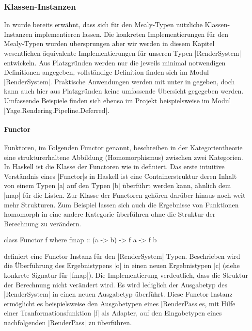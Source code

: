 
\subsubsection{Klassen-Instanzen}
\label{sec:rendersystem-klassen-instanzen}

In  wurde bereits erwähnt, dass sich für den Mealy-Typen nützliche Klassen-Instanzen implementieren lassen. Die konkreten Implementierungen für den Mealy-Typen wurden übersprungen aber wir werden in diesem Kapitel wesentlichen äquivalente Implementierungen für unseren Typen |RenderSystem| entwickeln. Aus Platzgründen werden nur die jeweils minimal notwendigen Definitionen angegeben, vollständige Definition finden sich im Modul |RenderSystem|. Praktische Anwendungen werden mit unter in  gegeben, doch kann auch hier aus Platzgründen keine umfassende Übersicht gegegeben werden. Umfassende Beispiele finden sich ebenso im Projekt beispielsweise im Modul |Yage.Rendering.Pipeline.Deferred|.



\paragraph{Functor} 
Funktoren, im Folgenden Functor genannt, beschreiben in der Kategorientheorie eine strukturerhaltene Abbildung (Homomorphismus) zwischen zwei Kategorien. In Haskell ist die Klasse der Functoren wie in  definiert. Das erste intuitive Verständnis eines |Functor|s in Haskell ist eine Containerstruktur deren Inhalt von einem Typen |a| auf den Typen |b| überführt werden kann, ähnlich dem |map| für die Listen. Zur Klasse der Functoren gehören darüber hinaus noch weit mehr Strukturen. Zum Beispiel lassen sich auch die Ergebnisse von Funktionen homomorph in eine andere Kategorie überführen ohne die Struktur der Berechnung zu verändern.

\begin{haskell}[label={lst:class-functor},caption={Functor Klasse\protect\footnotemark},float,floatplacement=H,nolol]
class Functor f where
  fmap :: (a -> b) -> f a -> f b 
\end{haskell}

 definiert eine Functor Instanz für den |RenderSystem| Typen. Beschrieben wird die Überführung des Ergebnistypens |o| in einen neuen Ergebnistypen |c| (siehe konkrete Signatur für |fmap|). Die Implementierung verdeutlich, dass die Struktur der Berechnung nicht verändert wird. Es wird lediglich der Ausgabetyp des |RenderSystem| in einen neuen Ausgabetyp überführt. Diese Functor Instanz ermöglicht es beispielsweise den Ausgabetypen eines |RenderPass|es, mit Hilfe einer Tranformationsfunktion |f| als Adapter, auf den Eingabetypen eines nachfolgenden |RenderPass| zu überführen.


